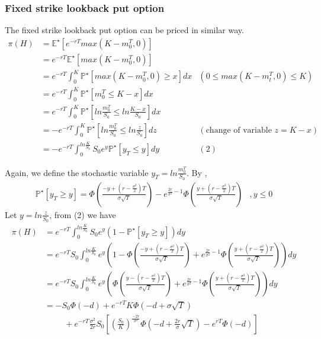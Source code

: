 \documentclass{article}
\begin{document}
\subsubsection{Fixed strike lookback put option
}
The fixed strike lookback put option can be priced in similar way.
\begin{align*}
\pi(H) 	&= \mathbb{E^{\star}}[e^{-rT} max(K - m_{0}^T, 0)] \\
			&= e^{-rT} \mathbb{E^{\star}}[max(K - m_{0}^T, 0)] \\
			&= e^{-rT} \int_{0}^{K} \mathbb{P}^{\star}[max(K - m_{0}^T, 0) \geq x]dx  &(0 \leq max(K - m_{t}^{T}, 0) \leq K)\\
			&= e^{-rT} \int_{0}^{K} \mathbb{P}^{\star}[m_{0}^T \leq K-x]dx \\
			&= e^{-rT} \int_{0}^{K} \mathbb{P}^{\star}[ln \frac{m_{0}^T}{S_0} \leq ln \frac{K-x}{S_0}]dx \\
			&= -e^{-rT} \int_{0}^{K} \mathbb{P}^{\star}[ln \frac{m_{0}^T}{S_0} \leq ln \frac{z}{S_0}]dz &(\text{change of variable } z=K-x) \\
			&= -e^{-rT} \int_{0}^{ln\frac{K}{S_0}} S_0e^{y} \mathbb{P}^{\star}[y_T \leq y]dy &(2)
\end{align*}

Again, we define the stochastic variable $y_T= ln \frac{m_{0}^{T}}{S_0}$. By \cite{Peter1},
\begin{align*}
\mathbb{P}^{\star}[y_T \geq y]= \Phi \left(\frac{-y+(r-\frac{\sigma^2}{2})T}{\sigma\sqrt{T}} \right) - e^{\frac{2r}{\sigma^2} - 1} \Phi \left(\frac{y+(r-\frac{\sigma^2}{2})T}{\sigma\sqrt{T}} \right)
&, y \leq 0
\end{align*}
Let $y=ln\frac{z}{S_0}$, from (2) we have
\begin{align*}
\pi(H) 	&= e^{-rT} \int_{0}^{ln\frac{K}{S_0}} S_0e^y( 1 - \mathbb{P}^{\star}[y_T \geq y])dy \\
			&= e^{-rT}S_0 \int_{0}^{ln\frac{K}{S_0}}  e^y \left( 1 -  
			\Phi \left(\frac{-y+(r-\frac{\sigma^2}{2})T}{\sigma\sqrt{T}} \right) + e^{\frac{2r}{\sigma^2} - 1} \Phi \left(\frac{y+(r-\frac{\sigma^2}{2})T}{\sigma\sqrt{T}} \right)
			\right) dy \\
			&= e^{-rT}S_0 \int_{0}^{ln\frac{K}{S_0}} e^y \left( 
			\Phi \left(\frac{y-(r-\frac{\sigma^2}{2})T}{\sigma\sqrt{T}} \right) + e^{\frac{2r}{\sigma^2} - 1} \Phi \left(\frac{y+(r-\frac{\sigma^2}{2})T}{\sigma\sqrt{T}} \right)
			\right) dy \\
			&= -S_0 \Phi(-d) + e^{-rT}K \Phi(-d + \sigma \sqrt{T} ) \\
			&\hspace{1cm} + e^{-rT}\frac{\sigma^2}{2r}S_0 \left[
			\left(\frac{S_0}{K}\right)^{\frac{-2r}{\sigma^2}} \Phi\left(-d+ \frac{2r}{\sigma}\sqrt{T} \right) - e^{rT}\Phi(-d)
			\right]
\end{align*}
\end{document}
